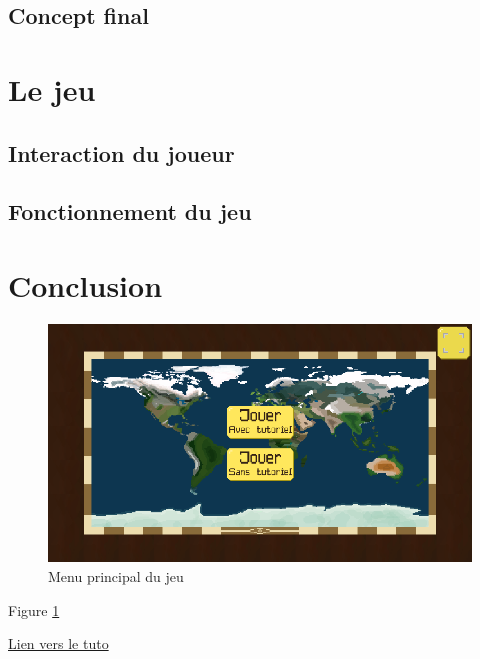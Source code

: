 \documentclass{article}
\begin{document}
        \subsection{Concept final}

        \section{Le jeu}
        \subsection{Interaction du joueur}

        \subsection{Fonctionnement du jeu}
        
        \section{Conclusion}

        \begin{figure}[h]
                \includegraphics[width=\linewidth]{../images/mainMenu}
                \caption{Menu principal du jeu}
                \label{fig:mainMenu}
        \end{figure}

        Figure \ref{fig:mainMenu}

        \href{https://www.latex-tutorial.com/tutorials/pgfplots/}{Lien vers le tuto}
\end{document}
